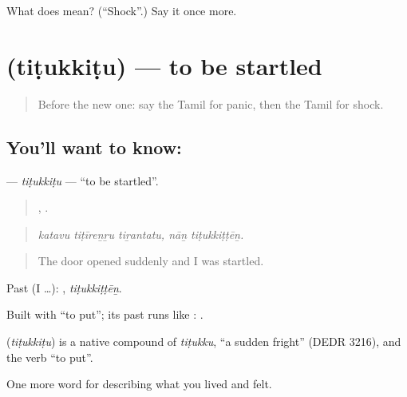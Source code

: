 \begin{tcolorbox}[breakable,colback=teal!4,colframe=teal!35!black,title={Before you move on}]
What does  mean? (\textquotedblleft{}Shock\textquotedblright{}.) Say it once more.
\end{tcolorbox}
\section[\texorpdfstring{\ta{திடுக்கிடு} (tiṭukkiṭu)}{திடுக்கிடு (tiṭukkiṭu)}]{ (tiṭukkiṭu) — to be startled}

\label{lesson:TA-C454-titukkitu}



\begin{quote}
Before the new one: say the Tamil for panic, then the Tamil for shock.
\end{quote}

\subsection*{You'll want to know: }
\textbf{} — \emph{tiṭukkiṭu} — \textquotedblleft{}to be startled\textquotedblright{}.

\begin{quote}
  ,  .
\end{quote}

\begin{quote}
\emph{katavu tiṭīreṉṟu tiṟantatu, nāṉ tiṭukkiṭṭēṉ.}
\end{quote}

\begin{quote}
The door opened suddenly and I was startled.
\end{quote}

Past (I …): , \emph{tiṭukkiṭṭēṉ}.

Built with  \textquotedblleft{}to put\textquotedblright{}; its past runs like : .

\begin{cousinweb}
\textbf{} (\emph{tiṭukkiṭu}) is a native compound of  \emph{tiṭukku}, \textquotedblleft{}a sudden fright\textquotedblright{} (DEDR 3216), and the verb  \textquotedblleft{}to put\textquotedblright{}.
\end{cousinweb}

\begin{grammarlens}[title={What you've built}]
One more word for describing what you lived and felt.
\end{grammarlens}

